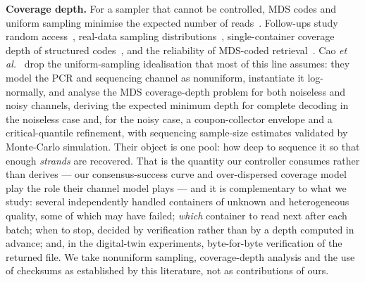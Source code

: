 \documentclass[conference,onecolumn,11pt]{IEEEtran}
\begin{document}
\textbf{Coverage depth.}  For a sampler that cannot be controlled, MDS codes and uniform
sampling minimise the expected number of reads~\cite{barlev2025cover}.  Follow-ups study random
access~\cite{gruica2024combinatorial}, real-data sampling distributions~\cite{cao2025optimizing},
single-container coverage depth of structured codes~\cite{bertuzzo2025coverage}, and the
reliability of MDS-coded retrieval~\cite{kashanna2026reliability}.  Cao
\emph{et al.}~\cite{cao2026modeling} drop the uniform-sampling idealisation that most of this line
assumes: they model the PCR and sequencing channel as nonuniform, instantiate it log-normally, and
analyse the MDS coverage-depth problem for both noiseless and noisy channels, deriving the expected
minimum depth for complete decoding in the noiseless case and, for the noisy case, a
coupon-collector envelope and a critical-quantile refinement, with sequencing sample-size estimates
validated by Monte-Carlo simulation.  Their object is one pool: how deep to sequence it so that enough
\emph{strands} are recovered.  That is the quantity our controller consumes rather than derives --- our
consensus-success curve and over-dispersed coverage model play the role their channel model plays --- and
it is complementary to what we study: several independently handled containers of unknown and
heterogeneous quality, some of which may have failed; \emph{which} container to read next after each
batch; when to stop, decided by verification rather than by a depth computed in advance; and, in the
digital-twin experiments, byte-for-byte verification of the returned file.  We take nonuniform sampling,
coverage-depth analysis and the use of checksums as established by this literature, not as contributions
of ours.
\end{document}

